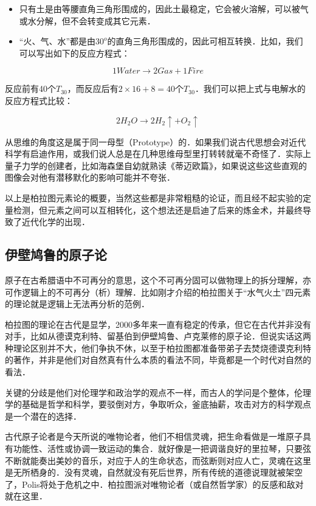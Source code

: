 \begin{itemize}
\item 只有土是由等腰直角三角形围成的，因此土最稳定，它会被火溶解，可以被气或水分解，但不会转变成其它元素．

\item “火、气、水”都是由$30^o$的直角三角形围成的，因此可相互转换．比如，我们可以写出如下的反应方程式：
\end{itemize}

\begin{equation}
1 Water \to 2 Gas + 1 Fire 
\end{equation}

反应前有40个$T_{30}$，而反应后有$2 \times 16 + 8 = 40$个$T_{30}$．我们可以把上式与电解水的反应方程式比较：

\begin{equation}
2 H_2 O \to 2 H_2 \uparrow + O_2 \uparrow
\end{equation}

从思维的角度这是属于同一母型（Prototype）的．如果我们说古代思想会对近代科学有启迪作用，或我们说人总是在几种思维母型里打转转就毫不奇怪了．实际上量子力学的创建者，比如海森堡自幼就熟读《蒂迈欧篇》，如果说这些这些直观的图像会对他有潜移默化的影响可能并不夸张．

以上是柏拉图元素论的概要，当然这些都是非常粗糙的论证，而且经不起实验的定量检测，但元素之间可以互相转化，这个想法还是启迪了后来的炼金术，并最终导致了近代化学的出现．

\subsection{伊壁鸠鲁的原子论}

原子在古希腊语中不可再分的意思，这个不可再分固可以做物理上的拆分理解，亦可作逻辑上的不可再分（析）理解．比如刚才介绍的柏拉图关于“水气火土”四元素的理论就是逻辑上无法再分析的范例．

柏拉图的理论在古代是显学，2000多年来一直有稳定的传承，但它在古代并非没有对手，比如从德谟克利特、留基伯到伊壁鸠鲁、卢克莱修的原子论．但说实话这两种理论区别并不大，他们争执不休，以至于柏拉图都准备带弟子去焚烧德谟克利特的著作，并非是他们对自然真有什么本质的看法不同，毕竟都是一个时代对自然的看法．

关键的分歧是他们对伦理学和政治学的观点不一样，而古人的学问是个整体，伦理学的基础是哲学和科学，要驳倒对方，争取听众，釜底抽薪，攻击对方的科学观点是一个潜在的选择．

古代原子论者是今天所说的唯物论者，他们不相信灵魂，把生命看做是一堆原子具有功能性、活性或协调一致运动的集合．就好像是一把调谐良好的里拉琴，只要弦不断就能奏出美妙的音乐，对应于人的生命状态，而弦断则对应人亡，灵魂在这里是无所栖身的．没有灵魂，自然就没有死后世界，所有传统的道德说理就被架空了，Polis将处于危机之中．柏拉图派对唯物论者（或自然哲学家）的反感和敌对就在这里．

